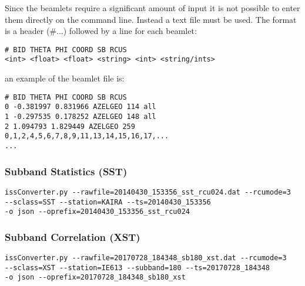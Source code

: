 \documentclass[10pt,a4paper]{article}
\begin{document}
Since the beamlets require a significant amount of input it is not possible to
enter them directly on the command line. Instead a text file must be used. The
format is a header (\#...) followed by a line for each beamlet:

\begin{verbatim}
# BID THETA PHI COORD SB RCUS
<int> <float> <float> <string> <int> <string/ints>
\end{verbatim}

\noindent an example of the beamlet file is:

\begin{verbatim}
# BID THETA PHI COORD SB RCUS
0 -0.381997 0.831966 AZELGEO 114 all
1 -0.297535 0.178252 AZELGEO 148 all
2 1.094793 1.829449 AZELGEO 259 0,1,2,4,5,6,7,8,9,11,13,14,15,16,17,...
...
\end{verbatim}

\subsubsection{Subband Statistics (SST)}

\begin{verbatim}
issConverter.py --rawfile=20140430_153356_sst_rcu024.dat --rcumode=3
--sclass=SST --station=KAIRA --ts=20140430_153356
-o json --oprefix=20140430_153356_sst_rcu024
\end{verbatim}


\subsubsection{Subband Correlation (XST)}

\begin{verbatim}
issConverter.py --rawfile=20170728_184348_sb180_xst.dat --rcumode=3
--sclass=XST --station=IE613 --subband=180 --ts=20170728_184348
-o json --oprefix=20170728_184348_sb180_xst
\end{verbatim}
\end{document}
